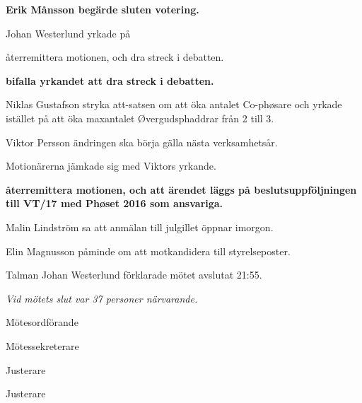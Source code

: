 \documentclass[10pt]{article}
\def\mo{Johan Westerlund}
\def\ms{Erik Månsson}
\def\ji{Elin Magnusson}
\def\jii{Pontus Landgren}
\begin{document}
\begin{paragrafer}
\textbf{Erik Månsson begärde sluten votering.}

Johan Westerlund yrkade på
\begin{attsatser}
    \att återremittera motionen, och
    \att dra streck i debatten.
\end{attsatser}

\textbf{\Mba bifalla yrkandet att dra streck i debatten.}

Niklas Gustafson \ypa stryka att-satsen om att öka antalet Co-phøsare och yrkade istället på att öka maxantalet Øvergudsphaddrar från 2 till 3.

Viktor Persson \ypa ändringen ska börja gälla nästa verksamhetsår.

Motionärerna jämkade sig med Viktors yrkande.

\textbf{\Mba återremittera motionen, och att ärendet läggs på beslutsuppföljningen till VT/17 med Phøset 2016 som ansvariga.}

Malin Lindström sa att anmälan till julgillet öppnar imorgon.

Elin Magnusson påminde om att motkandidera till styrelseposter.

Talman {\mo} förklarade mötet avslutat 21:55.

\emph{Vid mötets slut var 37 personer närvarande.}

\end{paragrafer}

\hidesignfoot
\begin{signatures}{4}
\signature{\mo}{Mötesordförande}
\signature{\ms}{Mötessekreterare}
\signature{\ji}{Justerare}
\signature{\jii}{Justerare}
\end{signatures}
\end{document}
